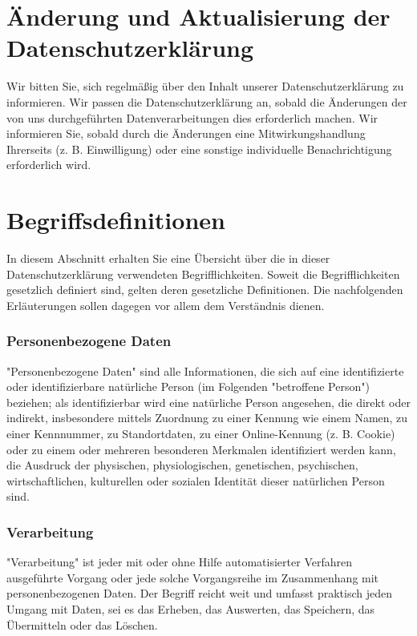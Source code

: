 \documentclass[12pt]{article}
\begin{document}
\part{Änderung und Aktualisierung der Datenschutzerklärung}
Wir bitten Sie, sich regelmäßig über den Inhalt unserer Datenschutzerklärung zu informieren. Wir passen die Datenschutzerklärung an, sobald die Änderungen der von uns durchgeführten Datenverarbeitungen dies erforderlich machen. Wir informieren Sie, sobald durch die Änderungen eine Mitwirkungshandlung Ihrerseits (z. B. Einwilligung) oder eine sonstige individuelle Benachrichtigung erforderlich wird.

\part{Begriffsdefinitionen}
In diesem Abschnitt erhalten Sie eine Übersicht über die in dieser Datenschutzerklärung verwendeten Begrifflichkeiten. Soweit die Begrifflichkeiten gesetzlich definiert sind, gelten deren gesetzliche Definitionen. Die nachfolgenden Erläuterungen sollen dagegen vor allem dem Verständnis dienen.
\section{Personenbezogene Daten}
"Personenbezogene Daten" sind alle Informationen, die sich auf eine identifizierte oder identifizierbare natürliche Person (im Folgenden "betroffene Person") beziehen; als identifizierbar wird eine natürliche Person angesehen, die direkt oder indirekt, insbesondere mittels Zuordnung zu einer Kennung wie einem Namen, zu einer Kennnummer, zu Standortdaten, zu einer Online-Kennung (z. B. Cookie) oder zu einem oder mehreren besonderen Merkmalen identifiziert werden kann, die Ausdruck der physischen, physiologischen, genetischen, psychischen, wirtschaftlichen, kulturellen oder sozialen Identität dieser natürlichen Person sind.
\section{Verarbeitung}
"Verarbeitung" ist jeder mit oder ohne Hilfe automatisierter Verfahren ausgeführte Vorgang oder jede solche Vorgangsreihe im Zusammenhang mit personenbezogenen Daten. Der Begriff reicht weit und umfasst praktisch jeden Umgang mit Daten, sei es das Erheben, das Auswerten, das Speichern, das Übermitteln oder das Löschen.
\end{document}
